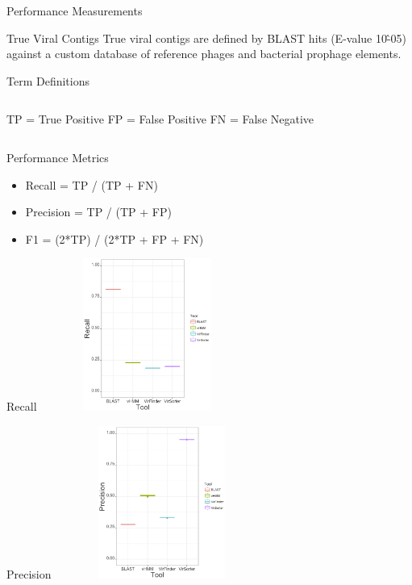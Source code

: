 \documentclass[11pt]{beamer}
\begin{document}
	
	\begin{frame}{Performance Measurements}
	
	\begin{block}{True Viral Contigs}
	True viral contigs are defined by BLAST hits (E-value 10\^-05) against a custom database of reference phages and bacterial prophage elements. 
	\end{block}
	
	\begin{block}{Term Definitions}
	\begin{columns}
	TP = True Positive
	FP = False Positive
	FN = False Negative
	\end{columns}
	
	\end{block}
	\vspace{-0.2cm}
	\begin{block}{Performance Metrics}
	\begin{itemize}
	\item Recall = TP / (TP + FN)
	\item Precision = TP / (TP + FP)
	\item F1 = (2*TP) / (2*TP + FP + FN)
	\end{itemize}
	\end{block}
	\end{frame}
	
	\begin{frame}{Recall}
	\vspace{-1cm}
	\center
	\includegraphics[height=5cm, width=7cm]{Recall.png}
	\end{frame}
	
	\begin{frame}{Precision}
	\vspace{-1cm}
	\center
	\includegraphics[height=5cm, width=7cm]{Precision.png}
	\end{frame}
	
\end{document}
